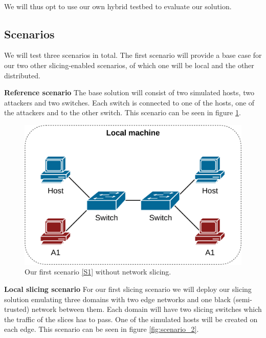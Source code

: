 \paragraph{} We will thus opt to use our own hybrid testbed to evaluate our solution.

\subsection{Scenarios}
\label{scenarios}
We will test three scenarios in total. The first scenario will provide a base case for our two other slicing-enabled scenarios, of which one will be local and the other distributed.

\begin{description}[style=multiline, labelwidth=0.7cm]
    \item[\namedlabel{S1}{S1}] \textbf{Reference scenario} The base solution will consist of two simulated hosts, two attackers and two switches. Each switch is connected to one of the hosts, one of the attackers and to the other switch. This scenario can be seen in figure \ref{fig:scenario_1}.
    \begin{figure}[ht]
        \centering
        \includegraphics[width=12cm]{images/chapter_7/scenario_1.png}
        \caption[Validation Scenario 1]{Our first scenario \ref{S1} without network slicing.}
        \label{fig:scenario_1}
    \end{figure}
    \item[\namedlabel{S2}{S2}] \textbf{Local slicing scenario} For our first slicing scenario we will deploy our slicing solution emulating three domains with two edge networks and one black (semi-trusted) network between them. Each domain will have two slicing switches which the traffic of the slices has to pass. One of the simulated hosts will be created on each edge. This scenario can be seen in figure \ref{fig:scenario_2}.

\end{description}
